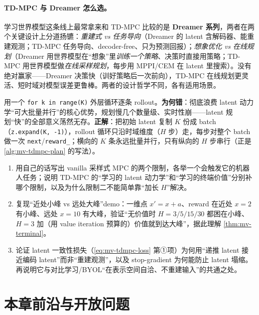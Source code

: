 \paragraph{TD-MPC 与 Dreamer 怎么选。}
学习世界模型这条线上最常拿来和 TD-MPC 比较的是 \textbf{Dreamer 系列}\cite{hafner2023dreamerv3}，两者在两个关键设计上分道扬镳：\emph{重建式 vs 任务导向}（Dreamer 的 latent 含解码器、能重建观测；TD-MPC 任务导向、decoder-free、只为预测回报）；\emph{想象优化 vs 在线规划}（Dreamer 用世界模型在“想象”里\emph{训练一个策略}、决策时直接用策略；TD-MPC 用世界模型做\emph{在线采样规划}，每步用 MPPI/CEM 在 latent 里搜索）。没有绝对赢家——Dreamer 决策快（训好策略后一次前向），TD-MPC 在线规划更灵活、短时域对模型误差更鲁棒。两者的设计哲学不同，各有适用场景。

\begin{pitfall}
用一个 \texttt{for k in range(K)} 外层循环逐条 rollout。\textbf{为何错}：彻底浪费 latent 动力学“可大批量并行”的核心优势，规划慢几个数量级、实时性崩——latent 规划“快”的全部意义荡然无存。\textbf{正解}：把初始 latent 复制 $K$ 份成 batch（\texttt{z.expand(K, -1)}），rollout 循环只沿时域维度（$H$ 步）走，每步对整个 batch 做一次 \texttt{next}/\texttt{reward\_}；横向的 $K$ 条永远批量并行，只有纵向的 $H$ 步串行（正是 \cref{alg:mv-tdmpc-plan} 的写法）。
\end{pitfall}

\begin{practice}
\begin{enumerate}
  \item 用自己的话写出 vanilla 采样式 MPC 的两个限制，各举一个会触发它的机器人任务；说明 TD-MPC 的“学习的 latent 动力学”和“学习的终端价值”分别补哪个限制，以及为什么限制二不能简单靠“加长 $H$”解决。
  \item 复现“近处小峰 vs 远处大峰”demo：一维点 $x'=x+a$、reward 在近处 $x=2$ 有小峰、远处 $x=10$ 有大峰，验证“无价值时 $H=3/5/15/30$ 都困在小峰、$H=3$ 加（用 value iteration 预算的）价值就到达大峰”，据此理解 \cref{thm:mv-terminal}。
  \item 论证 latent 一致性损失（\cref{eq:mv-tdmpc-loss} 第①项）为何用“递推 latent 接近编码 latent”而非“重建观测”，以及 stop-gradient 为何能防止 latent 塌缩。再说明它与对比学习/BYOL“在表示空间自洽、不重建输入”的共通之处。
\end{enumerate}
\end{practice}

\section*{本章前沿与开放问题}
\label{sec:mv-frontier}

